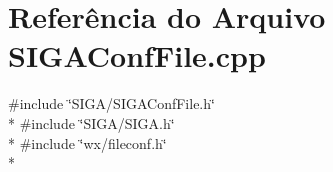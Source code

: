 \section{Referência do Arquivo S\+I\+G\+A\+Conf\+File.\+cpp}
\label{_s_i_g_a_conf_file_8cpp}
{\ttfamily \#include \char`\"{}S\+I\+G\+A/\+S\+I\+G\+A\+Conf\+File.\+h\char`\"{}}\\*
{\ttfamily \#include \char`\"{}S\+I\+G\+A/\+S\+I\+G\+A.\+h\char`\"{}}\\*
{\ttfamily \#include \char`\"{}wx/fileconf.\+h\char`\"{}}\\*
